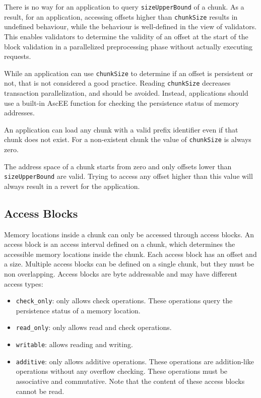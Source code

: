 There is no way for an application to query \texttt{sizeUpperBound} of a chunk. As a result, for an application,
accessing offsets higher than \texttt{chunkSize} results in undefined behaviour, while the behaviour is well-defined
in the view of validators.
This enables validators to determine the validity of an offset at the start of the block validation in a parallelized
preprocessing phase without actually executing requests.

While an application can use \texttt{chunkSize} to determine if an offset is persistent or not, that is not
considered a good practice. Reading \texttt{chunkSize} decreases transaction parallelization, and should be avoided.
Instead, applications should use a built-in AscEE function for checking the persistence status of memory addresses.

An application can load any chunk with a valid prefix identifier even if that chunk does not exist. For a non-existent
chunk the value of \texttt{chunkSize} is always zero.

The address space of a chunk starts from zero and only offsets lower than \texttt{sizeUpperBound} are valid. Trying to
access any offset higher than this value will always result in a revert for the application.

\subsection{Access Blocks}\label{subsec:access-blocks}

Memory locations inside a chunk can only be accessed through access blocks. An access block is an access interval
defined on a chunk, which determines the accessible memory locations inside the chunk. Each access block has an offset
and a size. Multiple access blocks can be defined on a single chunk, but they must be non overlapping.
Access blocks are byte addressable and may have different access types:

\begin{itemize}
    \item \texttt{check\_only}: only allows check operations. These operations query the persistence
    status of a memory location.
    \item \texttt{read\_only}: only allows read and check operations.
    \item \texttt{writable}: allows reading and writing.
    \item \texttt{additive}: only allows additive operations. These operations are addition-like operations without
    any overflow checking. These operations must be associative and commutative. Note that the content of
    these access blocks cannot be read.
\end{itemize}

